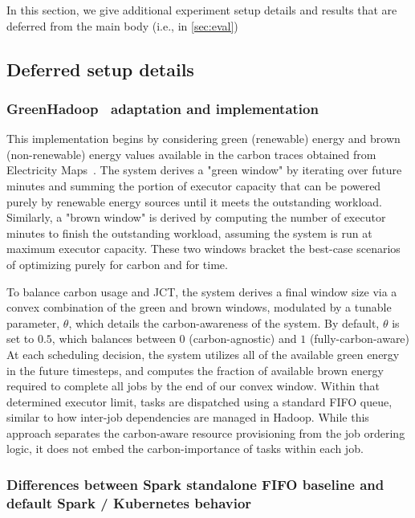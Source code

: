 
In this section, we give additional experiment setup details and results that are deferred from the main body (i.e., in \autoref{sec:eval})



\subsection{Deferred setup details} \label{apx:extra-details}

\subsubsection{\textbf{GreenHadoop~\cite{Goiri:2012:GreenHadoop} adaptation and implementation}} \label{apx:greenhadoop}

This implementation begins by considering green (renewable) energy and brown (non-renewable) energy values available in the carbon traces obtained from Electricity Maps~\cite{electricity-map}. The system derives a "green window" by iterating over future minutes and summing the portion of executor capacity that can be powered purely by renewable energy sources until it meets the outstanding workload. Similarly, a "brown window" is derived by computing the number of executor minutes to finish the outstanding workload, assuming the system is run at maximum executor capacity. These two windows bracket the best-case scenarios of optimizing purely for carbon and for time. 

To balance carbon usage and JCT, the system derives a final window size via a convex combination of the green and brown windows, modulated by a tunable parameter, $\theta$, which details the carbon-awareness of the system. By default, $\theta$ is set to $0.5$, which balances between $0$ (carbon-agnostic) and $1$ (fully-carbon-aware) At each scheduling decision, the system utilizes all of the available green energy in the future timesteps, and computes the fraction of available brown energy required to complete all jobs by the end of our convex window. Within that determined executor limit, tasks are dispatched using a standard FIFO queue, similar to how inter-job dependencies are managed in Hadoop. While this approach separates the carbon-aware resource provisioning from the job ordering logic, it does not embed the carbon-importance of tasks within each job. 





\subsubsection{\textbf{Differences between Spark standalone FIFO baseline and default Spark / Kubernetes behavior}} \label{apx:fifo-vs-k8s}

